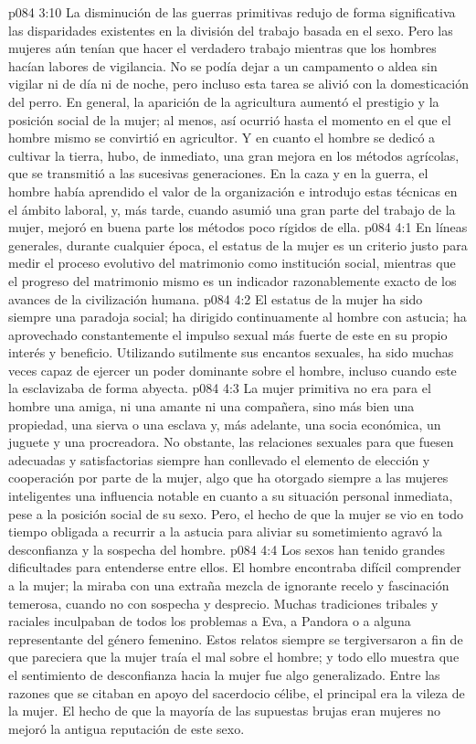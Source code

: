 \vs p084 3:10 La disminución de las guerras primitivas redujo de forma significativa las disparidades existentes en la división del trabajo basada en el sexo. Pero las mujeres aún tenían que hacer el verdadero trabajo mientras que los hombres hacían labores de vigilancia. No se podía dejar a un campamento o aldea sin vigilar ni de día ni de noche, pero incluso esta tarea se alivió con la domesticación del perro. En general, la aparición de la agricultura aumentó el prestigio y la posición social de la mujer; al menos, así ocurrió hasta el momento en el que el hombre mismo se convirtió en agricultor. Y en cuanto el hombre se dedicó a cultivar la tierra, hubo, de inmediato, una gran mejora en los métodos agrícolas, que se transmitió a las sucesivas generaciones. En la caza y en la guerra, el hombre había aprendido el valor de la organización e introdujo estas técnicas en el ámbito laboral, y, más tarde, cuando asumió una gran parte del trabajo de la mujer, mejoró en buena parte los métodos poco rígidos de ella.
\vs p084 4:1 En líneas generales, durante cualquier época, el estatus de la mujer es un criterio justo para medir el proceso evolutivo del matrimonio como institución social, mientras que el progreso del matrimonio mismo es un indicador razonablemente exacto de los avances de la civilización humana.
\vs p084 4:2 \pc El estatus de la mujer ha sido siempre una paradoja social; ha dirigido continuamente al hombre con astucia; ha aprovechado constantemente el impulso sexual más fuerte de este en su propio interés y beneficio. Utilizando sutilmente sus encantos sexuales, ha sido muchas veces capaz de ejercer un poder dominante sobre el hombre, incluso cuando este la esclavizaba de forma abyecta.
\vs p084 4:3 La mujer primitiva no era para el hombre una amiga, ni una amante ni una compañera, sino más bien una propiedad, una sierva o una esclava y, más adelante, una socia económica, un juguete y una procreadora. No obstante, las relaciones sexuales para que fuesen adecuadas y satisfactorias siempre han conllevado el elemento de elección y cooperación por parte de la mujer, algo que ha otorgado siempre a las mujeres inteligentes una influencia notable en cuanto a su situación personal inmediata, pese a la posición social de su sexo. Pero, el hecho de que la mujer se vio en todo tiempo obligada a recurrir a la astucia para aliviar su sometimiento agravó la desconfianza y la sospecha del hombre.
\vs p084 4:4 \pc Los sexos han tenido grandes dificultades para entenderse entre ellos. El hombre encontraba difícil comprender a la mujer; la miraba con una extraña mezcla de ignorante recelo y fascinación temerosa, cuando no con sospecha y desprecio. Muchas tradiciones tribales y raciales inculpaban de todos los problemas a Eva, a Pandora o a alguna representante del género femenino. Estos relatos siempre se tergiversaron a fin de que pareciera que la mujer traía el mal sobre el hombre; y todo ello muestra que el sentimiento de desconfianza hacia la mujer fue algo generalizado. Entre las razones que se citaban en apoyo del sacerdocio célibe, el principal era la vileza de la mujer. El hecho de que la mayoría de las supuestas brujas eran mujeres no mejoró la antigua reputación de este sexo.
